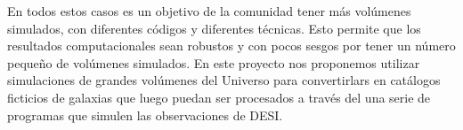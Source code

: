 En todos estos casos es un objetivo de la comunidad tener más
volúmenes simulados, con diferentes códigos y diferentes técnicas. 
Esto permite que los resultados computacionales sean robustos y con
pocos sesgos por tener un número pequeño de volúmenes simulados. 
En este proyecto nos proponemos utilizar simulaciones de grandes
volúmenes del Universo para convertirlars en cat\'alogos ficticios de
galaxias que  luego puedan ser procesados a trav\'es del una serie de
programas que simulen las observaciones de DESI.











